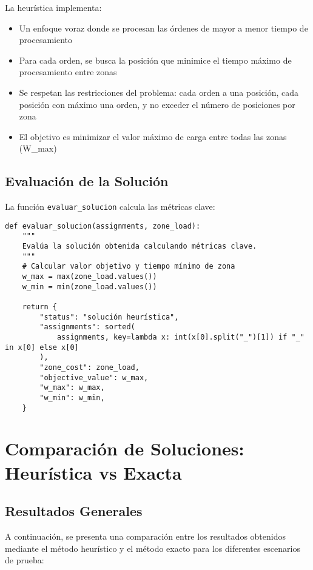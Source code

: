 \documentclass{hw-template}
\begin{document}
La heurística implementa:
\begin{itemize}
    \item Un enfoque voraz donde se procesan las órdenes de mayor a menor tiempo de procesamiento
    \item Para cada orden, se busca la posición que minimice el tiempo máximo de procesamiento entre zonas
    \item Se respetan las restricciones del problema: cada orden a una posición, cada posición con máximo una orden, y no exceder el número de posiciones por zona
    \item El objetivo es minimizar el valor máximo de carga entre todas las zonas (W\_max)
\end{itemize}

\subsection{Evaluación de la Solución}

La función \texttt{evaluar\_solucion} calcula las métricas clave:

\begin{verbatim}
def evaluar_solucion(assignments, zone_load):
    """
    Evalúa la solución obtenida calculando métricas clave.
    """
    # Calcular valor objetivo y tiempo mínimo de zona
    w_max = max(zone_load.values())
    w_min = min(zone_load.values())

    return {
        "status": "solución heurística",
        "assignments": sorted(
            assignments, key=lambda x: int(x[0].split("_")[1]) if "_" in x[0] else x[0]
        ),
        "zone_cost": zone_load,
        "objective_value": w_max,
        "w_max": w_max,
        "w_min": w_min,
    }
\end{verbatim}
\clearpage
\section{Comparación de Soluciones: Heurística vs Exacta}

\subsection{Resultados Generales}

A continuación, se presenta una comparación entre los resultados obtenidos mediante el método heurístico y el método exacto para los diferentes escenarios de prueba:
\end{document}
